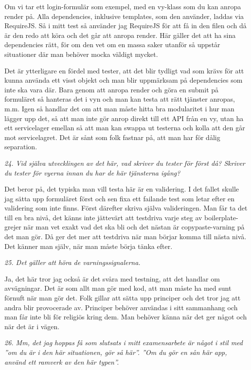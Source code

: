 \documentclass[11pt]{article}
\begin{document}
Om vi tar ett login-formulär som exempel, med en vy-klass som du kan anropa render på. Alla dependencies, inklusive templates, som den använder, laddas via RequireJS. Så i mitt test så använder jag RequireJS för att få in den filen och då är den redo att köra och det går att anropa render. Här gäller det att ha sina dependencies rätt, för om den vet om en massa saker utanför så uppstår situationer där man behöver mocka väldigt mycket.

Det är ytterligare en fördel med tester, att det blir tydligt vad som krävs för att kunna använda ett visst objekt och man blir uppmärksam på dependencies som inte ska vara där. Bara genom att anropa render och göra en submit på formuläret så hanteras det i vyn och man kan testa att rätt tjänster anropas, m.m. Igen så handlar det om att man måste hitta bra modularitet i hur man lägger upp det, så att man inte gör anrop direkt till ett API från en vy, utan ha ett servicelager emellan så att man kan swappa ut testerna och kolla att den går mot servicelagret. Det är sånt som folk fastnar på, att man har för dålig separation.

\emph{24. Vid själva utvecklingen av det här, vad skriver du tester för först då? Skriver du tester för vyerna innan du har de här tjänsterna igång?}

Det beror på, det typiska man vill testa här är en validering. I det fallet skulle jag sätta upp formuläret först och sen fixa ett failande test som letar efter en validering som inte finns. Först därefter skriva själva valideringen. Man får ta det till en bra nivå, det känns inte jättevärt att testdriva varje steg av boilerplate-grejer när man vet exakt vad det ska bli och det nästan är copypaste-varning på det man gör. Då ger det mer att testdriva när man börjar komma till nästa nivå. Det känner man själv, när man måste börja tänka efter.

\emph{25. Det gäller att höra de varningssignalerna.}

Ja, det här tror jag också är det svåra med testning, att det handlar om avvägningar. Det är som allt man gör med kod, att man måste ha med sunt förnuft när man gör det. Folk gillar att sätta upp principer och det tror jag att andra blir provocerade av. Principer behöver användas i sitt sammanhang och man får inte bli för religiös kring dem. Man behöver känna när det ger något och när det är i vägen.

\emph{26. Mm, det jag hoppas få som slutsats i mitt examensarbete är något i stil med ”om du är i den här situationen, gör så här”. ”Om du gör en sån här app, använd ett ramverk av den här typen”.}
\end{document}
